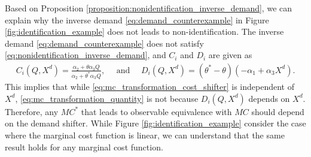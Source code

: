 \documentclass[11pt, a4paper]{article}
\theoremstyle{remark}
\begin{document}
Based on Proposition \ref{proposition:nonidentification_inverse_demand}, we can explain why the inverse demand \eqref{eq:demand_counterexample} in Figure \ref{fig:identification_example} does not leads to non-identification.
The inverse demand \eqref{eq:demand_counterexample} does not satisfy \eqref{eq:nonidentification_inverse_demand}, and $C_i$ and $D_i$ are given as
\begin{align}
    C_i(Q, X^{d}) = \frac{\alpha_2 + \theta\alpha_3Q}{\alpha_2 + \theta^{*}\alpha_3Q},\quad \text{ and }\quad  D_i(Q, X^{d}) =  (\theta^{*} - \theta)(-\alpha_1 + \alpha_3X^{d}).
\end{align}
This implies that while \eqref{eq:mc_transformation_cost_shifter} is independent of $X^{d}$, \eqref{eq:mc_transformation_quantity} is not because $D_i(Q, X^{d})$ depends on $X^{d}$.
Therefore, any $MC^{*}$ that leads to observable equivalence with $MC$ should depend on the demand shifter.
While Figure \ref{fig:identification_example} consider the case where the marginal cost function is linear, we can understand that the same result holds for any marginal cost function.
\end{document}
